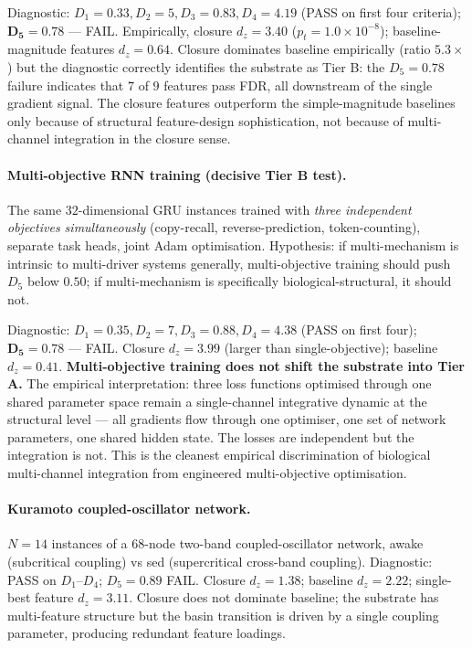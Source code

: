 \documentclass[11pt,a4paper]{article}
\begin{document}
Diagnostic: $D_1 = 0.33, D_2 = 5, D_3 = 0.83, D_4 = 4.19$ (PASS on first four criteria); $\mathbf{D_5 = 0.78}$ --- FAIL. Empirically, closure $d_z = 3.40$ ($p_t = 1.0 \times 10^{-8}$); baseline-magnitude features $d_z = 0.64$. Closure dominates baseline empirically (ratio $5.3\times$) but the diagnostic correctly identifies the substrate as Tier B: the $D_5 = 0.78$ failure indicates that $7$ of $9$ features pass FDR, all downstream of the single gradient signal. The closure features outperform the simple-magnitude baselines only because of structural feature-design sophistication, not because of multi-channel integration in the closure sense.

\paragraph{Multi-objective RNN training (decisive Tier B test).}
The same $32$-dimensional GRU instances trained with \emph{three independent objectives simultaneously} (copy-recall, reverse-prediction, token-counting), separate task heads, joint Adam optimisation. Hypothesis: if multi-mechanism is intrinsic to multi-driver systems generally, multi-objective training should push $D_5$ below $0.50$; if multi-mechanism is specifically biological-structural, it should not.

Diagnostic: $D_1 = 0.35, D_2 = 7, D_3 = 0.88, D_4 = 4.38$ (PASS on first four); $\mathbf{D_5 = 0.78}$ --- FAIL. Closure $d_z = 3.99$ (larger than single-objective); baseline $d_z = 0.41$. \textbf{Multi-objective training does not shift the substrate into Tier A.} The empirical interpretation: three loss functions optimised through one shared parameter space remain a single-channel integrative dynamic at the structural level --- all gradients flow through one optimiser, one set of network parameters, one shared hidden state. The losses are independent but the integration is not. This is the cleanest empirical discrimination of biological multi-channel integration from engineered multi-objective optimisation.

\paragraph{Kuramoto coupled-oscillator network.}
$N = 14$ instances of a $68$-node two-band coupled-oscillator network, awake (subcritical coupling) vs sed (supercritical cross-band coupling). Diagnostic: PASS on $D_1$--$D_4$; $D_5 = 0.89$ FAIL. Closure $d_z = 1.38$; baseline $d_z = 2.22$; single-best feature $d_z = 3.11$. Closure does not dominate baseline; the substrate has multi-feature structure but the basin transition is driven by a single coupling parameter, producing redundant feature loadings.
\end{document}
